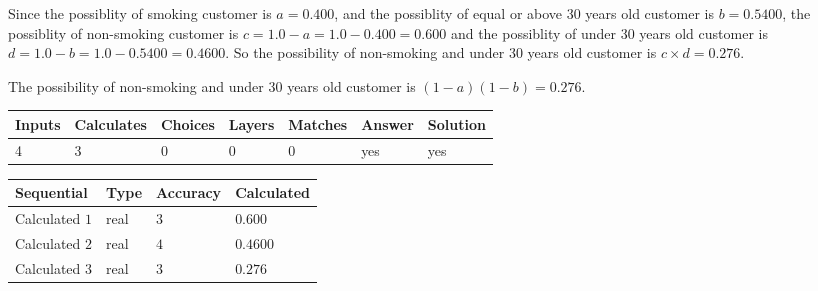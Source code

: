 \documentclass[12pt]{article}
\begin{document}
 

Since the possiblity of  %
smoking customer is $ a =  %
0.400 $,
and the possiblity of  %
equal or above 30 years old customer is $ b =  %
0.5400 $,
the possiblity of  %
non-smoking customer is $ c = 1.0 - a = 1.0 -
0.400
=  %
0.600 $ and the possiblity of  %
under 30 years old
customer is $ d = 1.0 - b = 1.0 -  %
0.5400 =  %
0.4600  $.
So the possibility of  %
 non-smoking and  %
under 30 years old
customer is $ c \times d =  %
0.276 $.
 
 
 
\noindent{}
 
 

 
 
 
\noindent{}
 
 

The possibility of  %
 non-smoking and  %
under 30 years old
customer is $ (1-a)(1-b) =  %
0.276 $.
 
 
\noindent{}
 
 

 
\vspace{0.3in}
   
   
   
   
\noindent\begin{tabular}{|l|l|l|l|l|l|l|}
 \hline
Inputs & Calculates & Choices & Layers & Matches & Answer & Solution \\ \hline
           4  & 
           3  & 
           0
  & 
           0  & 
           0  & 
  yes & 
  yes 
  \\ \hline
 \end{tabular}
   
   
   
   
\noindent{}
   
   
  
  
\noindent\begin{tabular}{|l|l|l|l|}
\hline
 Sequential & Type & Accuracy & Calculated \\ 
\hline
 
 
  Calculated $            1 $ & real & $            3  $ & 
 $ 0.600 $ 
 \\  \hline  
 
 
  Calculated $            2 $ & real & $            4  $ & 
 $ 0.4600 $ 
 \\  \hline  
 
 
  Calculated $            3 $ & real & $            3  $ & 
 $ 0.276 $ 
 \\  \hline  
 \end{tabular}
   
\end{document}
